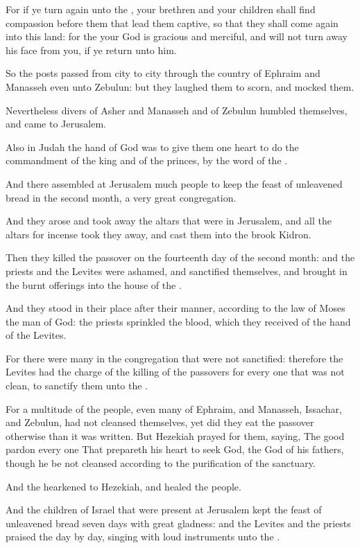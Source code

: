 \Verse For if ye turn again unto the \LORD, your brethren and your children shall find compassion before them that lead them captive, so that they shall come again into this land: for the \LORD your God is gracious and merciful, and will not turn away his face from you, if ye return unto him.

\Verse So the posts passed from city to city through the country of Ephraim and Manasseh even unto Zebulun: but they laughed them to scorn, and mocked them.

\Verse Nevertheless divers of Asher and Manasseh and of Zebulun humbled themselves, and came to Jerusalem.

\Verse Also in Judah the hand of God was to give them one heart to do the commandment of the king and of the princes, by the word of the \LORD.

\Verse And there assembled at Jerusalem much people to keep the feast of unleavened bread in the second month, a very great congregation.

\Verse And they arose and took away the altars that were in Jerusalem, and all the altars for incense took they away, and cast them into the brook Kidron.

\Verse Then they killed the passover on the fourteenth day of the second month: and the priests and the Levites were ashamed, and sanctified themselves, and brought in the burnt offerings into the house of the \LORD.

\Verse And they stood in their place after their manner, according to the law of Moses the man of God: the priests sprinkled the blood, which they received of the hand of the Levites.

\Verse For there were many in the congregation that were not sanctified: therefore the Levites had the charge of the killing of the passovers for every one that was not clean, to sanctify them unto the \LORD.

\Verse For a multitude of the people, even many of Ephraim, and Manasseh, Issachar, and Zebulun, had not cleansed themselves, yet did they eat the passover otherwise than it was written. But Hezekiah prayed for them, saying, The good \LORD pardon every one \Verse That prepareth his heart to seek God, the \LORD God of his fathers, though he be not cleansed according to the purification of the sanctuary.

\Verse And the \LORD hearkened to Hezekiah, and healed the people.

\Verse And the children of Israel that were present at Jerusalem kept the feast of unleavened bread seven days with great gladness: and the Levites and the priests praised the \LORD day by day, singing with loud instruments unto the \LORD.


